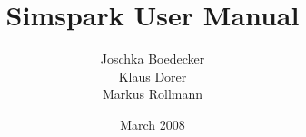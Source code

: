 

\author{Joschka Boedecker \\ Klaus Dorer \\ Markus Rollmann}
\title{Simspark User Manual}

\date{March 2008}



\maketitle
\cleardoublepage
\pagestyle{fancy}


\setlength{\headheight}{14pt}
\setlength{\parindent}{0.7cm}

\frontmatter
\tableofcontents
\mainmatter












\backmatter




\printindex 


